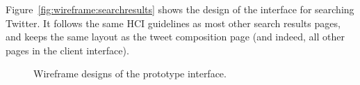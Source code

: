 \documentclass[11pt,a4paper]{report}
\begin{document}
Figure~\ref{fig:wireframe:searchresults} shows the design of the interface for searching Twitter. It follows the same HCI guidelines as most other search results pages, and keeps the same layout as the tweet composition page (and indeed, all other pages in the client interface).

\begin{figure}[htpb]
    \centering
    \caption{Wireframe designs of the prototype interface.}
    \label{fig:wireframes}
\end{figure}
\end{document}
